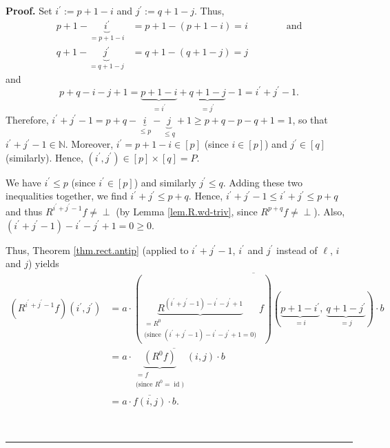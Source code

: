 \documentclass[numbers=enddot,12pt,final,onecolumn,notitlepage]{scrartcl}%
\theoremstyle{definition}
\newenvironment{verlong}{}{}
\newcommand{\undf}{\operatorname*{\bot}}
\newenvironment{proof}[1][Proof]{\noindent\textbf{#1.} }{\ \rule{0.5em}{0.5em}}
\begin{document}
\begin{verlong}
\begin{proof}
Set $i^{\prime}:=p+1-i$ and $j^{\prime}:=q+1-j$. Thus,
\begin{align*}
p+1-\underbrace{i^{\prime}}_{=p+1-i}  &  = p+1-\left(  p+1-i\right)  =
i\qquad\qquad\text{and}\\
q+1-\underbrace{j^{\prime}}_{=q+1-j}  &  = q+1-\left(  q+1-j\right)  = j
\end{align*}
and
\[
p+q-i-j+1=\underbrace{p+1-i}_{=i^{\prime}}+\underbrace{q+1-j}_{=j^{\prime}%
}-1=i^{\prime}+j^{\prime}-1.
\]
Therefore, $i^{\prime}+j^{\prime}-1=p+q-\underbrace{i}_{\leq p}-\underbrace{j}%
_{\leq q}+1\geq p+q-p-q+1=1$, so that $i^{\prime}+j^{\prime}-1\in\mathbb{N}$.
Moreover, $i^{\prime}=p+1-i\in\left[  p\right]  $ (since $i\in\left[
p\right]  $) and $j^{\prime}\in\left[  q\right]  $ (similarly). Hence,
$\left(  i^{\prime},j^{\prime}\right)  \in\left[  p\right]  \times\left[
q\right]  =P$.

We have $i^{\prime}\leq p$ (since $i^{\prime}\in\left[  p\right]  $) and
similarly $j^{\prime}\leq q$. Adding these two inequalities together, we find
$i^{\prime}+j^{\prime}\leq p+q$. Hence, $i^{\prime}+j^{\prime}-1\leq
i^{\prime}+j^{\prime}\leq p+q$ and thus $R^{i^{\prime}+j^{\prime}-1}%
f\neq\undf$ (by Lemma \ref{lem.R.wd-triv}, since $R^{p+q}f\neq\undf$). Also,
$\left(  i^{\prime}+j^{\prime}-1\right)  -i^{\prime}-j^{\prime}+1=0\geq0$.

Thus, Theorem \ref{thm.rect.antip} (applied to $i^{\prime}+j^{\prime}-1$,
$i^{\prime}$ and $j^{\prime}$ instead of $\ell$, $i$ and $j$) yields%
\begin{align}
\left(  R^{i^{\prime}+j^{\prime}-1}f\right)  \left(  i^{\prime},j^{\prime
}\right)   &  =a\cdot\overline{\left(  \underbrace{R^{\left(  i^{\prime
}+j^{\prime}-1\right)  -i^{\prime}-j^{\prime}+1}}_{\substack{=R^{0}%
\\\text{(since }\left(  i^{\prime}+j^{\prime}-1\right)  -i^{\prime}-j^{\prime
}+1=0\text{)}}}f\right)  \left(  \underbrace{p+1-i^{\prime}}_{=i}%
,\ \underbrace{q+1-j^{\prime}}_{=j}\right)  }\cdot b\nonumber\\
&  =a\cdot\overline{\underbrace{\left(  R^{0}f\right)  }%
_{\substack{=f\\\text{(since }R^{0}=\operatorname*{id}\text{)}}}\left(
i,j\right)  }\cdot b\nonumber\\
&  =a\cdot\overline{f\left(  i,j\right)  }\cdot b. \label{pf.thm.rect.ord.2}%
\end{align}



\end{proof}
\end{verlong}
\end{document}
